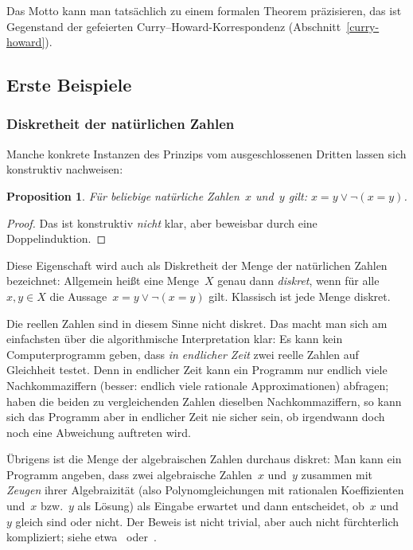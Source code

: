 \documentclass[a4paper,ngerman,12pt]{scrartcl}
\theoremstyle{definition}
\theoremstyle{plain}
\newtheorem{prop}[defn]{Proposition}
\theoremstyle{remark}
\renewcommand{\_}{\mathpunct{.}\,}
\newcommand{\?}{\,{:}\,}
\begin{document}
Das Motto kann man tatsächlich zu einem formalen Theorem
präzisieren, das ist Gegenstand der gefeierten
Curry--Howard-Korrespondenz (Abschnitt~\ref{curry-howard}).


\subsection{Erste Beispiele}

\subsubsection*{Diskretheit der natürlichen Zahlen}

Manche konkrete Instanzen des Prinzips vom ausgeschlossenen Dritten lassen sich
konstruktiv nachweisen:

\begin{prop}\label{natdiskret}Für beliebige natürliche Zahlen~$x$ und~$y$
gilt: $x = y \vee \neg(x = y)$.\end{prop}
\begin{proof}Das ist konstruktiv \emph{nicht} klar, aber beweisbar durch eine
Doppelinduktion.\end{proof}

Diese Eigenschaft wird auch als Diskretheit der Menge der natürlichen Zahlen
bezeichnet: Allgemein heißt eine Menge~$X$ genau dann \emph{diskret}, wenn für
alle~$x,y \in X$ die Aussage~$x = y \vee \neg(x = y)$ gilt. Klassisch ist jede
Menge diskret.

Die reellen Zahlen sind in diesem Sinne nicht diskret. Das macht
man sich am einfachsten über die algorithmische Interpretation klar: Es kann
kein Computerprogramm geben, dass \emph{in endlicher Zeit} zwei reelle Zahlen
auf Gleichheit testet. Denn in endlicher Zeit kann ein Programm nur endlich viele
Nachkommaziffern (besser: endlich viele rationale Approximationen) abfragen;
haben die beiden zu vergleichenden Zahlen dieselben Nachkommaziffern, so kann
sich das Programm aber in endlicher Zeit nie sicher sein, ob irgendwann doch noch
eine Abweichung auftreten wird.

Übrigens ist die Menge der algebraischen Zahlen durchaus diskret:
Man kann ein
Programm angeben, dass zwei algebraische Zahlen~$x$ und~$y$ zusammen mit \emph{Zeugen}
ihrer Algebraizität (also Polynomgleichungen mit rationalen Koeffizienten
und~$x$ bzw.~$y$ als Lösung) als Eingabe erwartet und dann entscheidet, ob~$x$
und~$y$ gleich sind oder nicht. Der Beweis ist nicht trivial, aber auch nicht
fürchterlich kompliziert; siehe etwa~\cite[Prop.~1.6]{nw:algebra}
oder~\cite[Kapitel~VI.1, Seite~140]{mines:richman:ruitenburg}.
\end{document}
